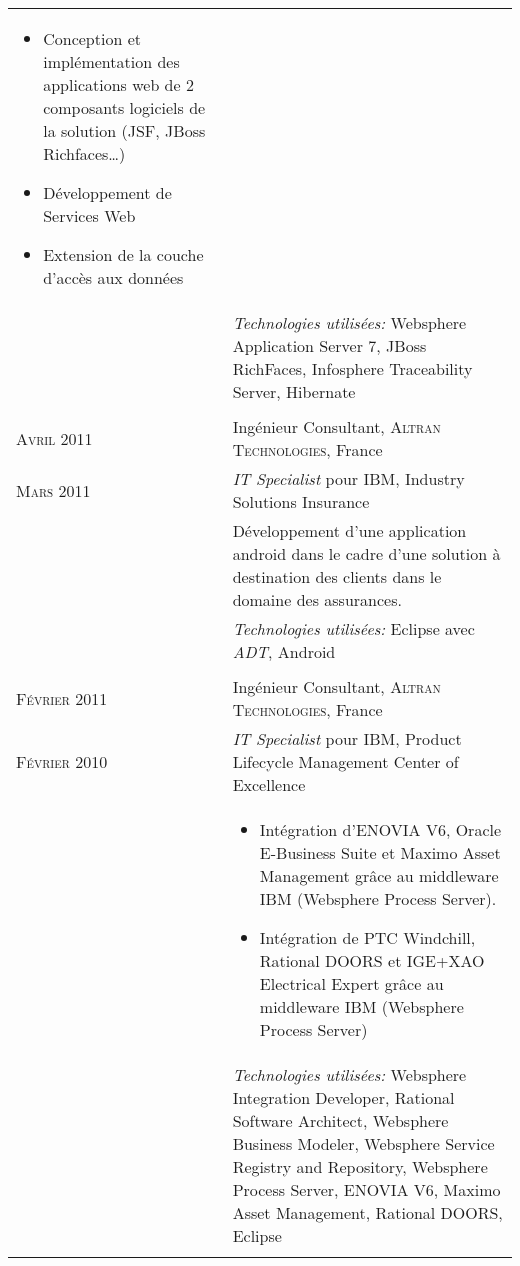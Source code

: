 \begin{longtable}{R{2.5cm}|p{14.8cm}}
{\begin{itemize}
			\item Conception et implémentation des applications web de 2 composants logiciels de la solution (JSF, JBoss Richfaces\ldots)
			\item Développement de Services Web
			\item Extension de la couche d'accès aux données
		\end{itemize}
		\vspace{-1em}
	}\\&
 	\footnotesize{\emph{Technologies utilisées:} Websphere Application Server 7, JBoss RichFaces, Infosphere Traceability Server, Hibernate }\\
  \\
 	\textsc{Avril 2011} & Ingénieur Consultant, \textsc{Altran Technologies}, France\\
 	\textsc{Mars 2011}& \emph{IT Specialist} pour IBM, Industry Solutions Insurance\\&
 	\footnotesize{Développement d'une application android dans le cadre d'une solution à destination 
 	des clients dans le domaine des assurances.}\\&
 	\footnotesize{\emph{Technologies utilisées:} Eclipse avec \emph{ADT}, Android}\\
  \\
\pagebreak[4]
 	\textsc{Février 2011} & Ingénieur Consultant, \textsc{Altran Technologies}, France\\
 	\textsc{Février 2010}& \emph{IT Specialist} pour IBM, Product Lifecycle Management Center of Excellence\\&
 	\footnotesize{
 		\begin{itemize}
 			\item Intégration d'ENOVIA V6, Oracle E-Business Suite et Maximo Asset Management grâce au middleware IBM (Websphere Process Server).
 			\item Intégration de PTC Windchill, Rational DOORS et IGE+XAO Electrical Expert grâce au middleware IBM (Websphere Process Server)
 		\end{itemize}
 		\vspace{-1em}
 	}\\&
 	\footnotesize{\emph{Technologies utilisées:} Websphere Integration Developer, Rational Software Architect, Websphere Business Modeler, Websphere Service Registry and Repository, 
 	Websphere Process Server, ENOVIA V6, Maximo Asset Management, Rational DOORS, Eclipse }\\
  \\

\end{longtable}
